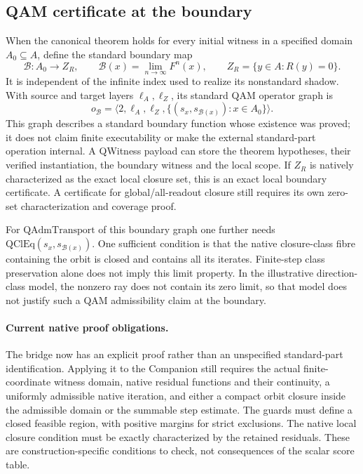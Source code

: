 \documentclass[11pt,a4paper]{article}
\begin{document}
\subsection{QAM certificate at the boundary}
When the canonical theorem holds for every initial witness in a specified
domain $A_0\subseteq A$, define the standard boundary map
\[
\mathcal B:A_0\to Z_R,\qquad
\mathcal B(x)=\lim_{n\to\infty}F^n(x),\qquad
Z_R=\{y\in A:R(y)=0\}.
\]
It is independent of the infinite index used to realize its nonstandard
shadow. With source and target layers $\ell_A,\ell_Z$, its standard QAM
operator graph is
\[
o_{\mathcal B}=\langle2,\ell_A,\ell_Z,
\{(s_x,s_{\mathcal B(x)}):x\in A_0\}\rangle.
\]
This graph describes a standard boundary function whose existence was proved;
it does not claim finite executability or make the external standard-part
operation internal. A QWitness payload can store the theorem hypotheses,
their verified instantiation, the boundary witness and the local scope.
If $Z_R$ is natively characterized as the exact local closure set, this is
an exact local boundary certificate. A certificate for global/all-readout
closure still requires its own zero-set characterization and coverage proof.

For $\mathrm{QAdmTransport}$ of this boundary graph one further needs
$\mathrm{QClEq}(s_x,s_{\mathcal B(x)})$. One sufficient condition is that
the native closure-class fibre containing the orbit is closed and contains
all its iterates. Finite-step class preservation alone does not imply this
limit property. In the illustrative direction-class model, the nonzero ray
does not contain its zero limit, so that model does not justify such a
QAM admissibility claim at the boundary.

\paragraph{Current native proof obligations.}
The bridge now has an explicit proof rather than an unspecified standard-part
identification. Applying it to the Companion still requires the actual
finite-coordinate witness domain, native residual functions and their
continuity, a uniformly admissible native iteration, and either a compact
orbit closure inside the admissible domain or the summable step estimate.
The guards must define a closed feasible region, with positive margins for
strict exclusions. The native local closure condition must be exactly
characterized by the retained residuals. These are construction-specific
conditions to check, not consequences of the scalar score table.
\end{document}

